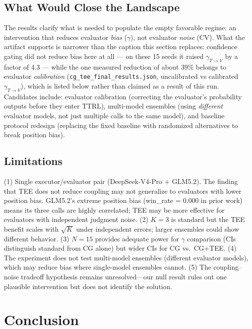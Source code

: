 \documentclass[11pt]{article}
\begin{document}
\subsection{What Would Close the Landscape}

The results clarify what is needed to populate the empty favorable regime: an intervention that reduces evaluator \textit{bias} ($\gamma$), not evaluator \textit{noise} (CV). What the artifact supports is narrower than the caption this section replaces: confidence gating did not reduce bias here at all --- on these 15 seeds it raised $\gamma_{T\to V}$ by a factor of 4.3 --- while the one measured reduction of about 39\% belongs to evaluator \emph{calibration} (\texttt{cg\_tee\_final\_results.json}, uncalibrated vs calibrated $\gamma_{T\to V}$), which is listed below rather than claimed as a result of this run. Candidates include: evaluator calibration (correcting the evaluator's probability outputs before they enter TTRL), multi-model ensembles (using \textit{different} evaluator models, not just multiple calls to the same model), and baseline protocol redesign (replacing the fixed baseline with randomized alternatives to break position bias).

\subsection{Limitations}

(1) Single executor/evaluator pair (DeepSeek-V4-Pro + GLM5.2). The finding that TEE does not reduce coupling may not generalize to evaluators with lower position bias. GLM5.2's extreme position bias (win\_rate = 0.000 in prior work) means its three calls are highly correlated; TEE may be more effective for evaluators with independent judgment noise. (2) $K{=}3$ is standard but the TEE benefit scales with $\sqrt{K}$ under independent errors; larger ensembles could show different behavior. (3) $N{=}15$ provides adequate power for $\gamma$ comparison (CIs distinguish standard from CG alone) but wider CIs for CG vs.\ CG+TEE. (4) The experiment does not test multi-model ensembles (different evaluator models), which may reduce bias where single-model ensembles cannot. (5) The coupling--noise tradeoff hypothesis remains unresolved---our null result rules out one plausible intervention but does not identify the solution.

\section{Conclusion}
\end{document}
